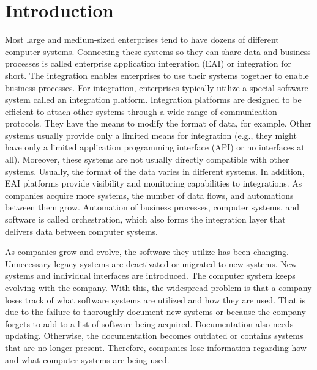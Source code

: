 \documentclass[english, 12pt, a4paper, sci, utf8, a-2b, online, obeyspaces]{aaltothesis}
\begin{document}
\cleardoublepage

\section{Introduction}
\label{sec:introduction}
\thispagestyle{empty}
Most large and medium-sized enterprises tend to have dozens of different computer systems. Connecting these systems so they can share data and business processes is called enterprise application integration (EAI) or integration for short. The integration enables enterprises to use their systems together to enable business processes. For integration, enterprises typically utilize a special software system called an integration platform. Integration platforms are designed to be efficient to attach other systems through a wide range of communication protocols. They have the means to modify the format of data, for example. Other systems usually provide only a limited means for integration (e.g., they might have only a limited application programming interface (API) or no interfaces at all). Moreover, these systems are not usually directly compatible with other systems. Usually, the format of the data varies in different systems. In addition, EAI platforms provide visibility and monitoring capabilities to integrations. As companies acquire more systems, the number of data flows, and automations between them grow. Automation of business processes, computer systems, and software is called orchestration, which also forms the integration layer that delivers data between computer systems.

As companies grow and evolve, the software they utilize has been changing. Unnecessary legacy systems are deactivated or migrated to new systems. New systems and individual interfaces are introduced. The computer system keeps evolving with the company. With this, the widespread problem is that a company loses track of what software systems are utilized and how they are used. That is due to the failure to thoroughly document new systems or because the company forgets to add to a list of software being acquired. Documentation also needs updating. Otherwise, the documentation becomes outdated or contains systems that are no longer present. Therefore, companies lose information regarding how and what computer systems are being used. 
\end{document}
